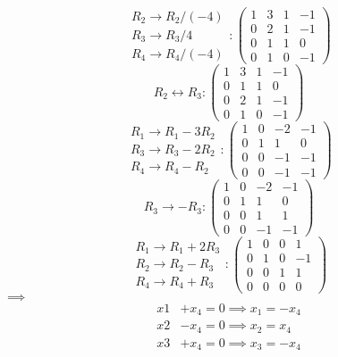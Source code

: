 \documentclass{article}
\begin{document}
\[\begin{matrix}
R_2 \to R_2 / (-4) \\
R_3 \to R_3 / 4 \\
R_4 \to R_4 / (-4)
\end{matrix}:
\begin{pmatrix}
1 & 3 & 1 & -1 \\
0 & 2 & 1 & -1 \\
0 & 1 & 1 & 0 \\
0 & 1 & 0 & -1
\end{pmatrix}\]
\[R_2 \leftrightarrow R_3: \begin{pmatrix}
1 & 3 & 1 & -1 \\
0 & 1 & 1 & 0 \\
0 & 2 & 1 & -1 \\
0 & 1 & 0 & -1
\end{pmatrix}\]
\[\begin{matrix}
R_1 \to R_1 - 3R_2 \\
R_3 \to R_3 - 2R_2 \\
R_4 \to R_4 - R_2
\end{matrix}:
\begin{pmatrix}
1 & 0 & -2 & -1 \\
0 & 1 & 1 & 0 \\
0 & 0 & -1 & -1 \\
0 & 0 & -1 & -1
\end{pmatrix}\]
\[R_3 \to -R_3: \begin{pmatrix}
1 & 0 & -2 & -1 \\
0 & 1 & 1 & 0 \\
0 & 0 & 1 & 1 \\
0 & 0 & -1 & -1
\end{pmatrix}\]
\[\begin{matrix}
R_1 \to R_1 + 2R_3 \\
R_2 \to R_2 - R_3 \\
R_4 \to R_4 + R_3
\end{matrix}:
\begin{pmatrix}
1 & 0 & 0 & 1 \\
0 & 1 & 0 & -1 \\
0 & 0 & 1 & 1 \\
0 & 0 & 0 & 0
\end{pmatrix}\]
$\implies$ \begin{align*}
    x1 &+ x_4 = 0 \implies x_1 = -x_4 \\
    x2 &- x_4 = 0 \implies x_2 = x_4 \\
    x3 &+ x_4 = 0 \implies x_3 = -x_4 \\
\end{align*}
\end{document}
